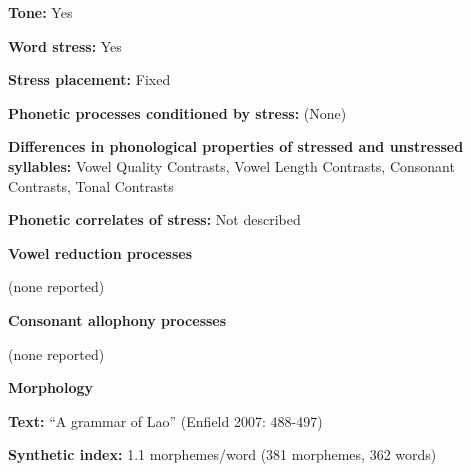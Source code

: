 \begin{styleBody}
\textbf{Tone:} Yes
\end{styleBody}

\begin{styleBody}
\textbf{Word stress:} Yes
\end{styleBody}

\begin{styleBody}
\textbf{Stress placement:} Fixed
\end{styleBody}

\begin{styleBody}
\textbf{Phonetic processes conditioned by stress:} (None)
\end{styleBody}

\begin{styleBody}
\textbf{Differences in phonological properties of stressed and unstressed syllables:} Vowel Quality Contrasts, Vowel Length Contrasts, Consonant Contrasts, Tonal Contrasts
\end{styleBody}

\begin{styleBody}
\textbf{Phonetic correlates of stress: }Not described
\end{styleBody}

\begin{styleBody}
\textbf{Vowel reduction processes}
\end{styleBody}

\begin{styleBody}
(none reported)
\end{styleBody}

\begin{styleBody}
\textbf{Consonant allophony processes}
\end{styleBody}

\begin{styleBody}
(none reported)
\end{styleBody}

\begin{styleBody}
\textbf{Morphology}
\end{styleBody}

\begin{styleBody}
\textbf{Text:} “A grammar of Lao” (Enfield 2007: 488-497)
\end{styleBody}

\begin{styleBody}
\textbf{Synthetic index: }1.1 morphemes/word (381 morphemes, 362 words)
\end{styleBody}

